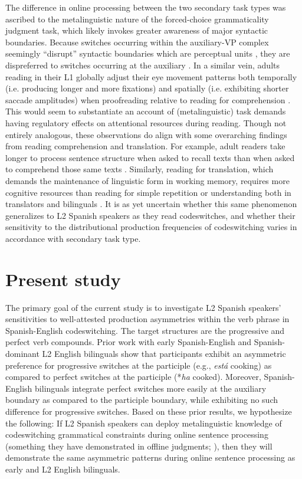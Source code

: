 \documentclass[output=paper,colorlinks,citecolor=brown]{langscibook}
\begin{document}
The difference in online processing between the two secondary task types was ascribed to the metalinguistic nature of the forced-choice grammaticality judgment task, which likely invokes greater awareness of major syntactic boundaries. Because switches occurring within the auxiliary-VP complex seemingly ``disrupt'' syntactic boundaries which are perceptual units \citep{Fodor1965}, they are dispreferred to switches occurring at the auxiliary \citep{ValdesKroffetal2018}. In a similar vein, adults reading in their L1 globally adjust their eye movement patterns both temporally (i.e. producing longer and more fixations) and spatially (i.e. exhibiting shorter saccade amplitudes) when proofreading relative to reading for comprehension \citep{Kaakinen2010}. This would seem to substantiate an account of (metalinguistic) task demands having regulatory effects on attentional resources during reading. Though not entirely analogous, these observations do align with some overarching findings from reading comprehension and translation. For example, adult readers take longer to process sentence structure when asked to recall texts than when asked to comprehend those same texts \citep{Aaronson1986}. Similarly, reading for translation, which demands the maintenance of linguistic form in working memory, requires more cognitive resources than reading for simple repetition or understanding both in translators and bilinguals \citep{MacizoBajo2006}. It is as yet uncertain whether this same phenomenon generalizes to L2 Spanish speakers as they read codeswitches, and whether their sensitivity to the distributional production frequencies of codeswitching varies in accordance with secondary task type.

\section{Present study}
The primary goal of the current study is to investigate L2 Spanish speakers’ sensitivities to well-attested production asymmetries within the verb phrase in Spanish-English codeswitching. The target structures are the progressive and perfect verb compounds. Prior work with early Spanish-English and Spanish-dominant L2 English bilinguals show that participants exhibit an asymmetric preference for progressive switches at the participle (e.g., \textit{est\'a} cooking) as compared to perfect switches at the participle (*\textit{ha} cooked). Moreover, Spanish-English bilinguals integrate perfect switches more easily at the auxiliary boundary as compared to the participle boundary, while exhibiting no such difference for progressive switches. Based on these prior results, we hypothesize the following: If L2 Spanish speakers can deploy metalinguistic knowledge of codeswitching grammatical constraints during online sentence processing (something they have demonstrated in offline judgments; \cite{Giancaspro2015}), then they will demonstrate the same asymmetric patterns during online sentence processing as early and L2 English bilinguals.
\end{document}
